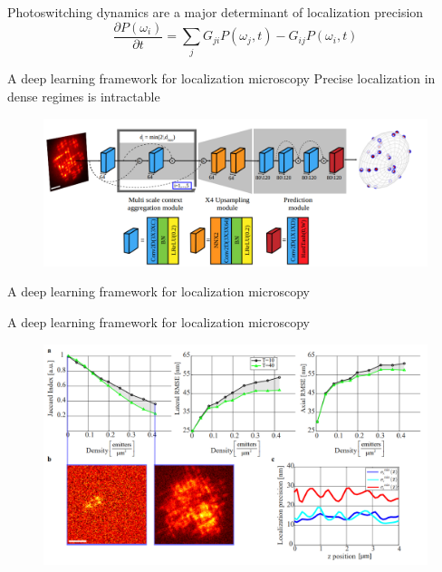 \documentclass{beamer}					%
\begin{document}
\begin{frame}{Photoswitching dynamics are a major determinant of localization precision}
\begin{equation*}
\frac{\partial P(\omega_{i})}{\partial t} = \sum_{j}G_{ji}P(\omega_{j},t) - G_{ij}P(\omega_{i},t)
\end{equation*}
\end{frame}

\begin{frame}{A deep learning framework for localization microscopy}
Precise localization in dense regimes is intractable
\begin{figure}
\includegraphics[width=13cm]{Network.png}
\end{figure}
\end{frame}

\begin{frame}{A deep learning framework for localization microscopy}
\end{frame}

\begin{frame}{A deep learning framework for localization microscopy}
\begin{figure}
\includegraphics[width=13cm]{Jaccard.png}
\end{figure}
\end{frame}
\end{document}
